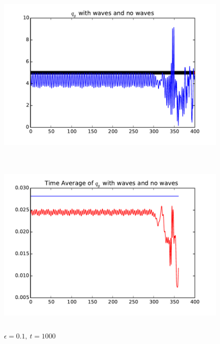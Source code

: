 \documentclass[12pt,twoside]{article}
\begin{document}
\begin{figure}

\includegraphics[width=8in,height=3.5in]{qg_e01.pdf}

\includegraphics[width=8in,height=3.5in]{TimeAverage_e01.pdf}
\caption{$\epsilon=0.1 ,\  t=1000$}

\end{figure}
\end{document}
